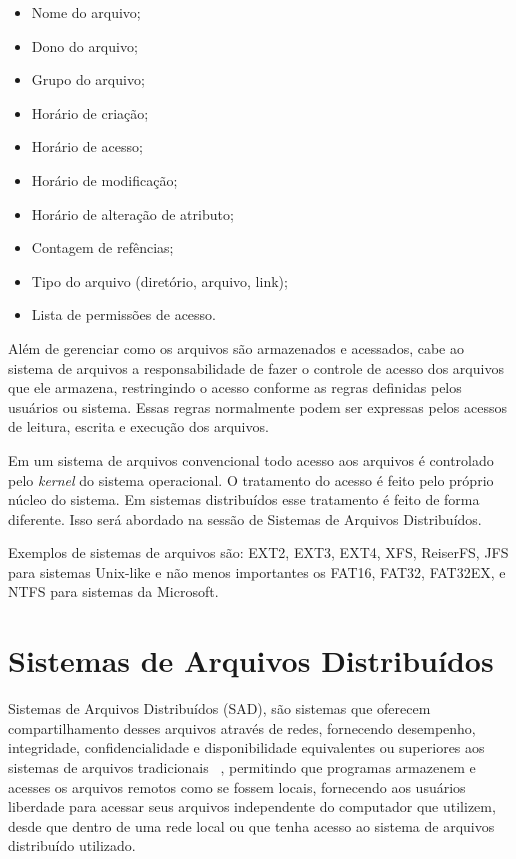     \begin{itemize}
        \item Nome do arquivo;
        \item Dono do arquivo;
        \item Grupo do arquivo;
        \item Horário de criação;
        \item Horário de acesso;
        \item Horário de modificação;
        \item Horário de alteração de atributo;
        \item Contagem de refências;
        \item Tipo do arquivo (diretório, arquivo, link);
        \item Lista de permissões de acesso.
    \end{itemize}
    
    Além de gerenciar como os arquivos são armazenados e acessados, cabe ao sistema de arquivos a responsabilidade de fazer o controle de acesso dos arquivos que ele armazena, restringindo o acesso conforme as regras definidas pelos usuários ou sistema. Essas regras normalmente podem ser expressas pelos acessos de leitura, escrita e execução dos arquivos.
    
    Em um sistema de arquivos convencional todo acesso aos arquivos é controlado pelo \textit{kernel} do sistema operacional. O tratamento do acesso é feito pelo próprio núcleo do sistema. Em sistemas distribuídos esse tratamento é feito de forma diferente. Isso será abordado na sessão de Sistemas de Arquivos Distribuídos.
    
    Exemplos de sistemas de arquivos são: EXT2, EXT3, EXT4, XFS, ReiserFS, JFS para sistemas Unix-like e não menos importantes os FAT16, FAT32, FAT32EX, e NTFS para sistemas da Microsoft.


\section{Sistemas de Arquivos Distribuídos}

	 Sistemas de Arquivos Distribuídos (SAD), são sistemas que oferecem compartilhamento desses arquivos através de redes, fornecendo desempenho, integridade, confidencialidade e disponibilidade equivalentes ou superiores aos sistemas de arquivos tradicionais ~\cite{coulouris}, permitindo que programas armazenem e acesses os arquivos remotos como se fossem locais, fornecendo aos usuários liberdade para acessar seus arquivos independente do computador que utilizem, desde que dentro de uma rede local ou que tenha acesso ao sistema de arquivos distribuído utilizado.
	 
